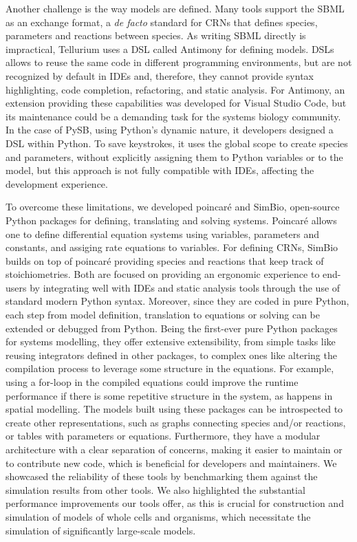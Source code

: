 \documentclass[namedate,numsec,webpdf,modern,large]{oup-authoring-template}
\theoremstyle{thmstyleone}%
\theoremstyle{thmstyletwo}%
\theoremstyle{thmstylethree}%
\begin{document}
Another challenge is the way models are defined.
Many tools support the \ac{SBML} \cite{huckaSBMLL3V2} as an exchange format,
a \emph{de facto} standard for \acp{CRN} that defines species, parameters and reactions between species.
As writing \ac{SBML} directly is impractical,
Tellurium uses a \ac{DSL} called Antimony \cite{smithAntimonyModularModel2009} for defining models.
\Acp{DSL} allows to reuse the same code in different programming environments,
but are not recognized by default in \acp{IDE}
and, therefore, they cannot provide syntax highlighting, code completion, refactoring, and static analysis.
For Antimony, an extension providing these capabilities was developed for Visual Studio Code,
but its maintenance could be a demanding task for the systems biology community.
In the case of PySB,
using Python's dynamic nature,
it developers designed a \ac{DSL} within Python.
To save keystrokes,
it uses the global scope to create species and parameters,
without explicitly assigning them to Python variables or to the model,
but this approach is not fully compatible with \acp{IDE},
affecting the development experience.

To overcome these limitations,
we developed poincaré and SimBio,
open-source Python packages for defining, translating and solving systems.
Poincaré allows one to define differential equation systems
using variables, parameters and constants,
and assiging rate equations to variables.
For defining \acp{CRN},
SimBio builds on top of poincaré providing species and reactions that keep track of stoichiometries.
Both are focused on providing an ergonomic experience to end-users
by integrating well with \acp{IDE} and static analysis tools
through the use of standard modern Python syntax.
Moreover, since they are coded in pure Python,
each step from model definition, translation to equations or solving
can be extended or debugged from Python.
Being the first-ever pure Python packages for systems modelling,
they offer extensive extensibility,
from simple tasks like reusing integrators defined in other packages,
to complex ones like altering the compilation process to leverage some structure in the equations.
For example, using a for-loop in the compiled equations could improve the runtime performance
if there is some repetitive structure in the system,
as happens in spatial modelling.
The models built using these packages can be introspected to create other representations,
such as graphs connecting species and/or reactions, or tables with parameters or equations.
Furthermore, they have a modular architecture with a clear separation of concerns,
making it easier to maintain or to contribute new code,
which is beneficial for developers and maintainers.
We showcased the reliability of these tools by benchmarking them against the simulation results from other tools.
We also highlighted the substantial performance improvements our tools offer,
as this is crucial for construction and simulation of models of whole cells and organisms,
which necessitate the simulation of significantly large-scale models.
\end{document}
